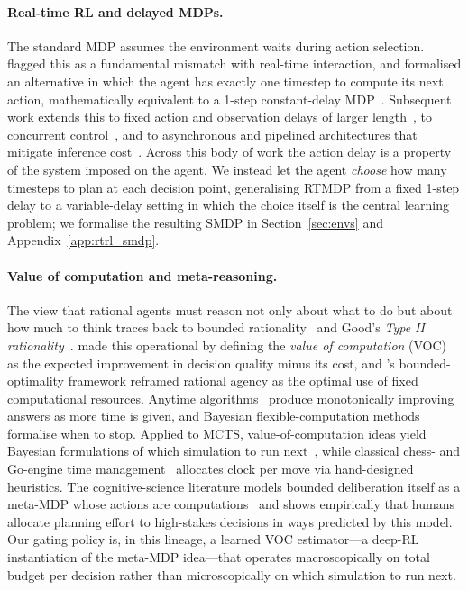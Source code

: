 \paragraph{Real-time RL and delayed MDPs.}
The standard MDP assumes the environment waits during action selection.
\citet{travnik2018reactive} flagged this as a fundamental mismatch with
real-time interaction, and \citet{ramstedt2019rtrl} formalised an alternative
in which the agent has exactly one timestep to compute its next action,
mathematically equivalent to a 1-step constant-delay
MDP~\citep{walsh2009delayed}.
Subsequent work extends this to fixed action and observation delays of
larger length~\citep{derman2021delayed,bouteiller2021random,katsikopoulos2003markov},
to concurrent control~\citep{xiao2020thinking}, and to asynchronous and
pipelined architectures that mitigate inference cost~\citep{riemer2025staggered,
anokhin2025handling}.
Across this body of work the action delay is a property of the system
imposed on the agent.
We instead let the agent \emph{choose} how many timesteps to plan at each decision
point, generalising RTMDP from a fixed 1-step delay to a variable-delay
setting in which the choice itself is the central learning problem; we
formalise the resulting SMDP in Section~\ref{sec:envs} and
Appendix~\ref{app:rtrl_smdp}.

\paragraph{Value of computation and meta-reasoning.}
The view that rational agents must reason not only about what to do but
about how much to think traces back to bounded
rationality~\citep{simon1955behavioral} and Good's \emph{Type II
rationality}~\citep{good1971twentyseven}.
\citet{russell1991right} made this operational by defining the
\emph{value of computation} (VOC) as the expected improvement in decision
quality minus its cost, and \citet{russell1995provably}'s
bounded-optimality framework reframed rational agency as the optimal use
of fixed computational resources.
Anytime algorithms~\citep{dean1988analysis,zilberstein1996using,
likhachev2003ara,korf1990rta} produce monotonically improving answers as
more time is given, and Bayesian flexible-computation
methods~\citep{horvitz1988reasoning} formalise when to stop.
Applied to MCTS, value-of-computation ideas yield Bayesian formulations
of which simulation to run next~\citep{hay2012selecting,tolpin2012simple,
sezener2020static,lin2015metareasoning}, while classical chess- and
Go-engine time management~\citep{baier2016time,huang2010timemanagement,
baudis2012pachi} allocates clock per move via hand-designed heuristics.
The cognitive-science literature models bounded deliberation itself as a
meta-MDP whose actions are computations~\citep{lieder2017strategy,
griffiths2019doing,callaway2018learning,cope_learning_2023} and shows
empirically that humans allocate planning effort to high-stakes
decisions in ways predicted by this model.
Our gating policy is, in this lineage, a learned VOC estimator---a
deep-RL instantiation of the meta-MDP idea---that operates macroscopically
on total budget per decision rather than microscopically on which
simulation to run next.

